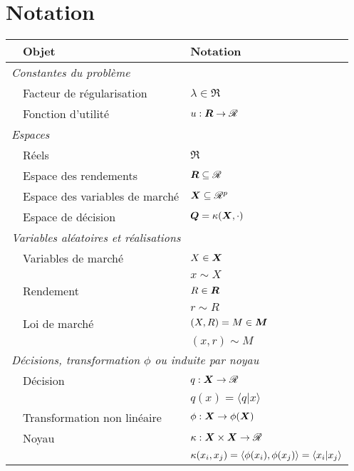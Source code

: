 \section*{Notation}

\begin{tabular}{@{}lll}
  &\textbf{Objet} & \textbf{Notation}\\
  \toprule
  \multicolumn{3}{l}{\textit{Constantes du problème}}\\[1ex]
  & Facteur de régularisation & $\lambda \in \Re$\\
  & Fonction d'utilité & $u:\bm{R}\to\mathscr{R}$\\
  \midrule
  \multicolumn{3}{l}{\textit{Espaces}\hspace{67ex}\,}\\[1ex]
  & Réels & $\Re$\\
  & Espace des rendements & $\bm{R} \subseteq \mathscr{R}$\\
  & Espace des variables de marché & $\bm{X} \subseteq \mathscr{R}^p$\\
  & Espace de décision & $\bm Q = \kappa(\bm{X},\cdot)$\\
  \midrule
  \multicolumn{3}{l}{\textit{Variables aléatoires et réalisations}}\\[1ex]
  &Variables de marché & $X \in \bm{X}$\\
  &               & $x \sim X$\\[0.8ex]
  &Rendement & $R \in \bm{R}$\\
  &               &$r \sim R$\\[0.8ex]
  &Loi de marché & $(X,R) = M \in \bm M$\\
  &               & $(x,r) \sim M$\\
  
  \midrule
  \multicolumn{3}{l}{\textit{Décisions, transformation $\phi$ ou induite par noyau}}\\[1ex]
  & Décision & $q:\bm{X}\to\mathscr{R}$\\
  & & $q(x) = \langle q|x \rangle$\\[0.8ex]
  & Transformation non linéaire & $\phi:\bm{X} \to \phi(\bm{X})$\\[0.8ex]
  & Noyau & $\kappa:\bm{X}\times\bm{X} \to \mathscr{R}$\\
  &                & $\kappa(x_i,x_j) = \langle\phi(x_i),\phi(x_j)\rangle  = \langle x_i|x_j \rangle$\\[0.8ex]
  \bottomrule
\end{tabular}


